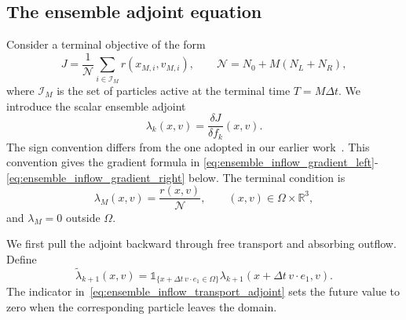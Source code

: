 \documentclass[12pt,nopreprintline]{elsarticle}
\begin{document}
\subsection{The ensemble adjoint equation}

Consider a terminal objective of the form
\begin{equation}
J
=
\frac{1}{\mathcal N}
\sum_{i\in\mathcal I_M}r(x_{M,i},v_{M,i}),
\qquad
\mathcal N=N_0+M(N_L+N_R),
\label{eq:ensemble_inflow_objective}
\end{equation}
where $\mathcal I_M$ is the set of particles active at the terminal time $T=M\Delta t$. We introduce the scalar ensemble adjoint
\[
\lambda_k(x,v)=\frac{\delta J}{\delta f_k}(x,v).
\]
The sign convention differs from the one adopted in our earlier work~\cite{caflisch2021adjoint}. This convention gives the gradient formula in
\eqref{eq:ensemble_inflow_gradient_left}-\eqref{eq:ensemble_inflow_gradient_right} below.
The terminal condition is
\begin{equation}
\lambda_M(x,v)=\frac{r(x,v)}{\mathcal N},
\qquad (x,v)\in\Omega\times\mathbb R^3,
\label{eq:ensemble_inflow_terminal_adjoint}
\end{equation}
and $\lambda_M=0$ outside $\Omega$.

We first pull the adjoint backward through free transport and absorbing outflow. Define
\begin{equation}
\widetilde\lambda_{k+1}(x,v)
=
\mathds{1}_{\{x+\Delta t\,v\cdot e_1\in\Omega\}}
\lambda_{k+1}(x+\Delta t\,v\cdot e_1,v).
\label{eq:ensemble_inflow_transport_adjoint}
\end{equation}
The indicator in~\eqref{eq:ensemble_inflow_transport_adjoint} sets the future value to zero when the corresponding particle leaves the domain.
\end{document}

